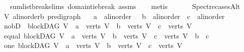 \begin{isabellebody}
%
\isadelimproof
\ \ %
\endisadelimproof
%
\isatagproof
{}\isamarkupfalse%
\ \ sumlist{\isacharunderscore}{\kern0pt}break{\isachardot}{\kern0pt}elims\ domain{\isacharunderscore}{\kern0pt}tie{\isacharunderscore}{\kern0pt}break\ assms\isanewline
\ \ \isamarkupfalse%
\ metis%
\endisatagproof
{\isafoldproof}%
%
\isadelimproof
\isanewline
%
\endisadelimproof
\ \ \isanewline
\ \ \isanewline
\isanewline
{}\isamarkupfalse%
\ Spectre{\isacharunderscore}{\kern0pt}casesAlt{\isacharcolon}{\kern0pt}\isanewline
\ \ \ V{\isacharcolon}{\kern0pt}{\isacharcolon}{\kern0pt}\ {\isachardoublequoteopen}{\isacharparenleft}{\kern0pt}{\isacharprime}{\kern0pt}a{\isacharcolon}{\kern0pt}{\isacharcolon}{\kern0pt}linorder{\isacharcomma}{\kern0pt}{\isacharprime}{\kern0pt}b{\isacharparenright}{\kern0pt}\ pre{\isacharunderscore}{\kern0pt}digraph{\isachardoublequoteclose}\isanewline
\ \ \ a\ {\isacharcolon}{\kern0pt}{\isacharcolon}{\kern0pt}\ {\isachardoublequoteopen}{\isacharprime}{\kern0pt}a{\isacharcolon}{\kern0pt}{\isacharcolon}{\kern0pt}linorder{\isachardoublequoteclose}\ \ \ b\ {\isacharcolon}{\kern0pt}{\isacharcolon}{\kern0pt}\ {\isachardoublequoteopen}{\isacharprime}{\kern0pt}a{\isacharcolon}{\kern0pt}{\isacharcolon}{\kern0pt}linorder{\isachardoublequoteclose}\ \ c\ {\isacharcolon}{\kern0pt}{\isacharcolon}{\kern0pt}\ {\isachardoublequoteopen}{\isacharprime}{\kern0pt}a{\isacharcolon}{\kern0pt}{\isacharcolon}{\kern0pt}linorder{\isachardoublequoteclose}\isanewline
\ \ \ {\isacharparenleft}{\kern0pt}no{\isacharunderscore}{\kern0pt}bD{\isacharparenright}{\kern0pt}\ {\isachardoublequoteopen}{\isacharparenleft}{\kern0pt}{\isasymnot}\ blockDAG\ V\ {\isasymor}\ a\ {\isasymnotin}\ verts\ V\ {\isasymor}\ b\ {\isasymnotin}\ verts\ V\ {\isasymor}\ c\ {\isasymnotin}\ verts\ V{\isacharparenright}{\kern0pt}{\isachardoublequoteclose}\isanewline
\ \ {\isacharbar}{\kern0pt}\ {\isacharparenleft}{\kern0pt}equal{\isacharparenright}{\kern0pt}\ {\isachardoublequoteopen}{\isacharparenleft}{\kern0pt}blockDAG\ V\ {\isasymand}\ a\ {\isasymin}\ verts\ V\ {\isasymand}\ b\ {\isasymin}\ verts\ V\ {\isasymand}\ c\ {\isasymin}\ verts\ V{\isacharparenright}{\kern0pt}\ {\isasymand}\ b\ {\isacharequal}{\kern0pt}\ c{\isachardoublequoteclose}\ \isanewline
\ \ {\isacharbar}{\kern0pt}\ {\isacharparenleft}{\kern0pt}one{\isacharparenright}{\kern0pt}\ {\isachardoublequoteopen}{\isacharparenleft}{\kern0pt}blockDAG\ V\ {\isasymand}\ a\ {\isasymin}\ verts\ V\ {\isasymand}\ b\ {\isasymin}\ verts\ V\ {\isasymand}\ c\ {\isasymin}\ verts\ V{\isacharparenright}{\kern0pt}\ {\isasymand}\isanewline

\end{isabellebody}

